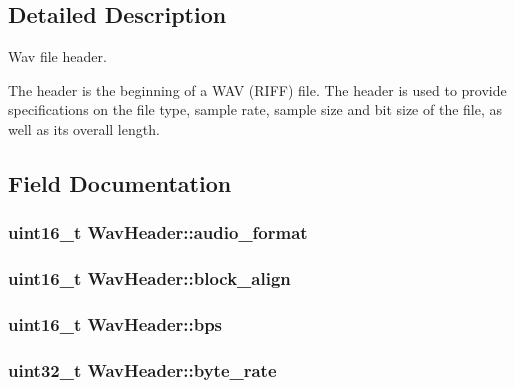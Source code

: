 \subsection{Detailed Description}
Wav file header. 

The header is the beginning of a W\+A\+V (R\+I\+F\+F) file. The header is used to provide specifications on the file type, sample rate, sample size and bit size of the file, as well as its overall length. 

\subsection{Field Documentation}
\hypertarget{structWavHeader_a175a26284b9fe51691b0a4e600997dca}{}
\subsubsection[{audio\+\_\+format}]{\setlength{\rightskip}{0pt plus 5cm}uint16\+\_\+t Wav\+Header\+::audio\+\_\+format}\label{structWavHeader_a175a26284b9fe51691b0a4e600997dca}
\hypertarget{structWavHeader_a55417acd8c1774caee8928ad8fe86c07}{}
\subsubsection[{block\+\_\+align}]{\setlength{\rightskip}{0pt plus 5cm}uint16\+\_\+t Wav\+Header\+::block\+\_\+align}\label{structWavHeader_a55417acd8c1774caee8928ad8fe86c07}
\hypertarget{structWavHeader_a891be94aa1622e40a40b1887ec0d950f}{}
\subsubsection[{bps}]{\setlength{\rightskip}{0pt plus 5cm}uint16\+\_\+t Wav\+Header\+::bps}\label{structWavHeader_a891be94aa1622e40a40b1887ec0d950f}
\hypertarget{structWavHeader_a9e6e51114d572f6fe71cd00cd101343d}{}
\subsubsection[{byte\+\_\+rate}]{\setlength{\rightskip}{0pt plus 5cm}uint32\+\_\+t Wav\+Header\+::byte\+\_\+rate}\label{structWavHeader_a9e6e51114d572f6fe71cd00cd101343d}
\hypertarget{structWavHeader_abd1d58ce017d5f2b70956efb6cf0b8fc}{}
